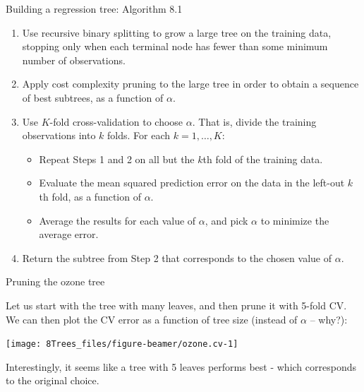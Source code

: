 \documentclass[10pt,ignorenonframetext,]{beamer}
\providecommand{\tightlist}{%
  \setlength{\itemsep}{0pt}\setlength{\parskip}{0pt}}
\begin{document}
\begin{frame}

\begin{block}{Building a regression tree: Algorithm 8.1}

\begin{enumerate}
\def\labelenumi{\arabic{enumi}.}
\item
  Use recursive binary splitting to grow a large tree on the training
  data, stopping only when each terminal node has fewer than some
  minimum number of observations.
\item
  Apply cost complexity pruning to the large tree in order to obtain a
  sequence of best subtrees, as a function of \(\alpha\).
\item
  Use \(K\)-fold cross-validation to choose \(\alpha\). That is, divide
  the training observations into \(k\) folds. For each
  \(k = 1,\ldots, K\):

  \begin{itemize}
  \tightlist
  \item
    Repeat Steps 1 and 2 on all but the \(k\)th fold of the training
    data.
  \item
    Evaluate the mean squared prediction error on the data in the
    left-out \(k\)th fold, as a function of \(\alpha\).
  \item
    Average the results for each value of \(\alpha\), and pick
    \(\alpha\) to minimize the average error.
  \end{itemize}
\item
  Return the subtree from Step 2 that corresponds to the chosen value of
  \(\alpha\).
\end{enumerate}

\end{block}

\end{frame}

\begin{frame}

\begin{block}{Pruning the ozone tree}

Let us start with the tree with many leaves, and then prune it with
5-fold CV. We can then plot the CV error as a function of tree size
(instead of \(\alpha\) -- why?):

\begin{center}\texttt{[image: 8Trees\_files/figure-beamer/ozone.cv-1]} \end{center}

Interestingly, it seems like a tree with 5 leaves performs best - which
corresponds to the original choice.

\end{block}

\end{frame}
\end{document}
